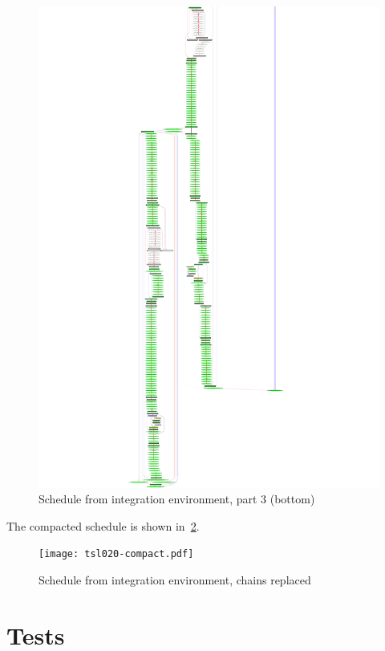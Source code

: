 \documentclass[12pt,a4paper]{report}
\begin{document}
    \begin{figure}
        \centering
        \includegraphics*[height=1.0\textheight,keepaspectratio]{tsl020-3.pdf}
        \caption{Schedule from integration environment, part 3 (bottom)}
        \label{fig:tsl020-3}
    \end{figure}
The compacted schedule is shown in~\ref{fig:tsl020-compact}.
    \begin{figure}
        \centering
        \texttt{[image: tsl020-compact.pdf]}
        \caption{Schedule from integration environment, chains replaced}
        \label{fig:tsl020-compact}
    \end{figure}


\chapter{Tests}
\end{document}
